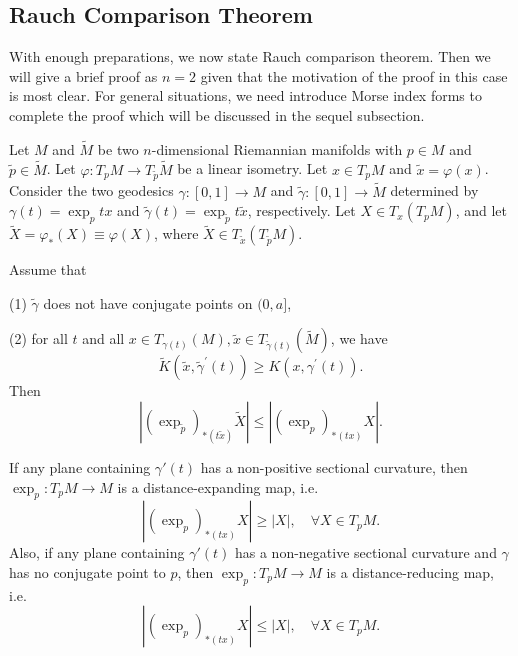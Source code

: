 \documentclass{ctexart}
\begin{document}
\subsection*{Rauch Comparison Theorem}

With enough preparations, we now state Rauch comparison theorem. Then we will give a brief proof as $n=2$ given that the motivation of the proof 
in this case is most clear. For general situations, we need introduce Morse index forms to complete the proof which will be discussed in the sequel subsection. 

Let $M$ and $\widetilde{M}$ be two $n$-dimensional Riemannian manifolds with $p\in M$ and $\widetilde{p}\in \widetilde{M}$. 
Let $\varphi:T_pM\rightarrow T_{\widetilde{p}}\widetilde{M}$ be a linear isometry. Let $x\in T_pM$ and $\widetilde{x}=\varphi(x)$. 
Consider the two geodesics $\gamma:[0,1]\rightarrow M$ and $\widetilde{\gamma}:[0,1]\rightarrow \widetilde{M}$ determined by 
$\gamma(t)=\exp_{p} t x$ and $\widetilde{\gamma}(t)=\exp_{\widetilde{p}} t \widetilde{x}$, respectively. Let $X\in T_x(T_pM)$, and 
let $\widetilde{X}=\varphi_*(X)\equiv \varphi(X)$, where $\widetilde{X}\in T_{\widetilde{x}}(T_{\widetilde{p}}M)$. 
\begin{theorem}
  Assume that 

  (1) $\tilde{\gamma}$ does not have conjugate points on $(0, a]$, 

  (2) for all $t$ and all $x \in T_{\gamma(t)}(M), \tilde{x} \in T_{\tilde{\gamma}(t)}(\tilde{M})$, we have
  $$
  \tilde{K}\left(\tilde{x}, \tilde{\gamma}^{\prime}(t)\right) \geq K\left(x, \gamma^{\prime}(t)\right). 
  $$
  Then 
  $$
  |(\exp_{\widetilde{p}})_{*(t\tilde{x})}\widetilde{X}|\leq |(\exp_{p})_{*(tx)} X|.
  $$
\end{theorem}

If any plane containing $\gamma'(t)$ has a non-positive sectional curvature, then $\exp_{p}: T_pM \rightarrow M$ is a distance-expanding map, i.e.
$$
\left|(\exp_{p})_{*(tx)} X\right| \geq |X|, \quad \forall X \in T_pM.
$$
Also, if any plane containing $\gamma'(t)$ has a non-negative sectional curvature and $\gamma$ has no conjugate point to $p$, 
then $\exp_{p}: T_pM \rightarrow M$ is a distance-reducing map, i.e.
$$
\left|(\exp_{p})_{*(tx)} X\right| \leq |X|, \quad \forall X \in T_pM.
$$
\end{document}
